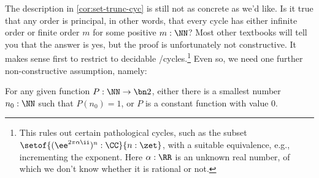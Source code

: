 The description in \cref{cor:set-trunc-cyc} is still not as concrete as we'd like.
Is it true that any order is principal, in other words,
that every cycle has either infinite order or finite order $m$
for some positive $m:\NN$?
Most other textbooks will tell you that the answer is yes,
but the proof is unfortunately not constructive.
It makes sense first to restrict to decidable \coverings/cycles.\footnote{%
  This rules out certain pathological cycles,
  such as the subset $\setof{(\ee^{2\pi\alpha\ii})^n:\CC}{n:\zet}$,
  with a suitable equivalence, e.g., incrementing the exponent.
  Here $\alpha:\RR$ is an unknown real number,
  of which we don't know whether it is rational or not.}
Even so, we need one further non-constructive assumption, namely:

\begin{principle}
  \label{LPO}%
  For any given function $P:\NN\to\bn 2$,
  either there is a smallest number $n_0:\NN$ such that $P(n_0)=1$,
  or $P$ is a constant function with value $0$.
\end{principle}


